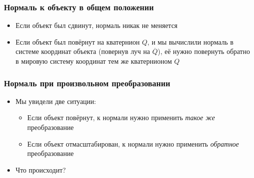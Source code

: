 \documentclass[10pt,handout]{beamer}
\begin{document}
\begin{frame}[fragile]
\frametitle{Нормаль к объекту в общем положении}
\begin{itemize}
\item Если объект был сдвинут, нормаль никак не меняется
\pause
\item Если объект был повёрнут на кватернион \begin{math}Q\end{math}, и мы вычислили нормаль в системе координат объекта (повернув луч на \begin{math}\overline Q\end{math}), её нужно повернуть обратно в мировую систему координат тем же кватернионом \begin{math}Q\end{math}
\end{itemize}
\end{frame}

\begin{frame}[fragile]
\frametitle{Нормаль при произвольном преобразовании}
\begin{itemize}
\item Мы увидели две ситуации:
\pause
\begin{itemize}
\item Если объект повёрнут, к нормали нужно применить \textit{такое же} преобразование
\pause
\item Если объект отмасштабирован, к нормали нужно применить \textit{обратное} преобразование
\end{itemize}
\pause
\item Что происходит?
\end{itemize}
\end{frame}
\end{document}
